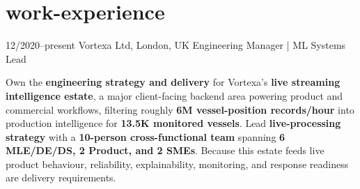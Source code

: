 \documentclass[]{../../friggeri-cv}
\begin{document}
\section{work-experience}
\begin{entrylist}
	\entry
	{12/2020–present}
	{Vortexa Ltd, London, UK}
		{Engineering Manager | ML Systems Lead}
	{
    	{\small
	    \setlength{\parindent}{0pt}
	    \setlength{\leftskip}{0pt}
							    Own the \textbf{engineering strategy and delivery} for Vortexa's \textbf{live streaming intelligence estate}, a major client-facing backend area powering product and commercial workflows, filtering roughly \textbf{6M vessel-position records/hour} into production intelligence for \textbf{13.5K monitored vessels}. Lead \textbf{live-processing strategy} with a \textbf{10-person cross-functional team} spanning \textbf{6 MLE/DE/DS, 2 Product, and 2 SMEs}. Because this estate feeds live product behaviour, reliability, explainability, monitoring, and response readiness are delivery requirements.
	    
}}
\end{entrylist}
\end{document}
